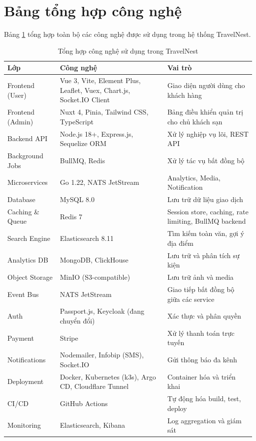\documentclass[13pt,a4paper,twoside]{report}
\begin{document}
\section{Bảng tổng hợp công nghệ}

Bảng \ref{tab:tech_stack} tổng hợp toàn bộ các công nghệ được sử dụng trong hệ thống TravelNest.

\begin{table}[H]
  \centering
  \caption{Tổng hợp công nghệ sử dụng trong TravelNest}
  \label{tab:tech_stack}
  \begin{tabularx}{\textwidth}{p{3.5cm} p{3.5cm} X}
    \toprule
    \textbf{Lớp} & \textbf{Công nghệ} & \textbf{Vai trò} \\
    \midrule
    Frontend (User) & Vue 3, Vite, Element Plus, Leaflet, Vuex, Chart.js, Socket.IO Client & Giao diện người dùng cho khách hàng \\
    Frontend (Admin) & Nuxt 4, Pinia, Tailwind CSS, TypeScript & Bảng điều khiển quản trị cho chủ khách sạn \\
    Backend API & Node.js 18+, Express.js, Sequelize ORM & Xử lý nghiệp vụ lõi, REST API \\
    Background Jobs & BullMQ, Redis & Xử lý tác vụ bất đồng bộ \\
    Microservices & Go 1.22, NATS JetStream & Analytics, Media, Notification \\
    Database & MySQL 8.0 & Lưu trữ dữ liệu giao dịch \\
    Caching \& Queue & Redis 7 & Session store, caching, rate limiting, BullMQ backend \\
    Search Engine & Elasticsearch 8.11 & Tìm kiếm toàn văn, gợi ý địa điểm \\
    Analytics DB & MongoDB, ClickHouse & Lưu trữ và phân tích sự kiện \\
    Object Storage & MinIO (S3-compatible) & Lưu trữ ảnh và media \\
    Event Bus & NATS JetStream & Giao tiếp bất đồng bộ giữa các service \\
    Auth & Passport.js, Keycloak (đang chuyển đổi) & Xác thực và phân quyền \\
    Payment & Stripe & Xử lý thanh toán trực tuyến \\
    Notifications & Nodemailer, Infobip (SMS), Socket.IO & Gửi thông báo đa kênh \\
    Deployment & Docker, Kubernetes (k3s), Argo CD, Cloudflare Tunnel & Container hóa và triển khai \\
    CI/CD & GitHub Actions & Tự động hóa build, test, deploy \\
    Monitoring & Elasticsearch, Kibana & Log aggregation và giám sát \\
    \bottomrule
  \end{tabularx}
\end{table}
\end{document}
